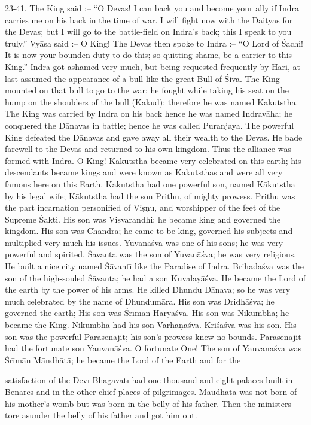 23-41. The King said :-- ``O Devas! I can back you and become your ally if Indra carries me on his back in the time of war. I will fight now with the Daityas for the Devas; but I will go to the battle-field on Indra's back; this I speak to you truly.'' Vy\=asa said :-- O King! The Devas then spoke to Indra :-- ``O Lord of \'Sachi! It is now your bounden duty to do this; so quitting shame, be a carrier to this King.'' Indra got ashamed very much, but being requested frequently by Hari, at last assumed the appearance of a bull like the great Bull of \'Siva. The King mounted on that bull to go to the war; he fought while taking his seat on the hump on the shoulders of the bull (Kakud); therefore he was named Kakutstha. The King was carried by Indra on his back hence he was named Indrav\=aha; he conquered the D\=anavas in battle; hence he was called Puranjaya. The powerful King defeated the D\=anavas and gave away all their wealth to the Devas. He bade farewell to the Devas and returned to his own kingdom. Thus the alliance was formed with Indra. O King! Kakutstha became very celebrated on this earth; his descendants became kings and were known as Kakutsthas and were all very famous here on this Earth. Kakutstha had one powerful son, named K\=akutstha by his legal wife; K\=akutstha had the son Prithu, of mighty prowess. Prithu was the part incarnation personified of Vi\d{s}\d{n}u, and worshipper of the feet of the Supreme \'Sakti. His son was Visvarandhi; he became king and governed the kingdom. His son was Chandra; he came to be king, governed his subjects and multiplied very much his issues. Yuvan\=a\'sva was one of his sons; he was very powerful and spirited. \'Savanta was the son of Yuvan\=a\'sva; he was very religious. He built a nice city named \'S\=avant\={\i} like the Paradise of Indra. Brihada\'sva was the son of the high-souled \'S\=avanta; he had a son Kuvalay\=a\'sva. He became the Lord of the earth by the power of his arms. He killed Dhundu D\=anava; so he was very much celebrated by the name of Dhundum\=ara. His son was Dridh\=a\'sva; he governed the earth; His son was \'Sr\={\i}m\=an Harya\'sva. His son was Nikumbha; he became the King. Nikumbha had his son Varha\d{n}\=a\'sva. Kri\'s\=a\'sva was his son. His son was the powerful Parasenajit; his son's prowess knew no bounds. Parasenajit had the fortunate son Yauvan\=a\'sva. O fortunate One! The son of Yauvana\'sva was \'Sr\={\i}m\=an M\=andh\=at\=a; he became the Lord of the Earth and for the

satisfaction of the Dev\={\i} Bhagavat\={\i} had one thousand and eight palaces built in Benares and in the other chief places of pilgrimages. M\=audh\=at\=a was not born of his mother's womb but was born in the belly of his father. Then the ministers tore asunder the belly of his father and got him out.

